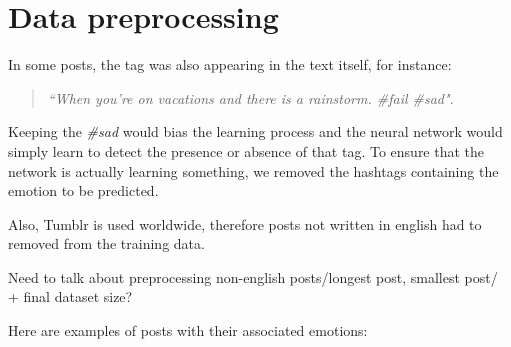 \section{Data preprocessing}
In some posts, the tag was also appearing in the text itself, for instance:
\begin{quote}
\textit{``When you're on vacations and there is a rainstorm. \#fail \#sad"}.
\end{quote}
Keeping the \textit{\#sad} would bias the learning process and the neural network would simply learn to detect the presence or absence of that tag. To ensure that the network is actually learning something, we removed the hashtags containing the emotion to be predicted.

Also, Tumblr is used worldwide, therefore posts not written in english had to removed from the training data.

Need to talk about preprocessing non-english posts/longest post, smallest post/ + final dataset size?

Here are examples of posts with their associated emotions:

